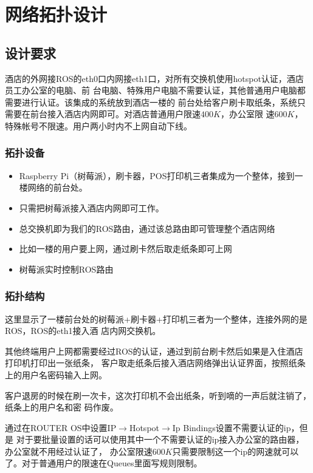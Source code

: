 \chapter{网络拓扑设计}

\section{设计要求}
酒店的外网接ROS的eth0口内网接eth1口，对所有交换机使用hotspot认证，酒店员工办公室的电脑、前
台电脑、特殊用户电脑不需要认证，其他普通用户电脑都需要进行认证。该集成的系统放到酒店一楼的
前台处给客户刷卡取纸条，系统只需要在前台接入酒店内网即可。对酒店普通用户限速$400K$，办公室限
速$600K$，特殊帐号不限速。用户两小时内不上网自动下线。

\subsection{拓扑设备}

\begin{itemize}
\item Raspberry Pi（树莓派），刷卡器，POS打印机三者集成为一个整体，接到一楼网络的前台处。
\item 只需把树莓派接入酒店内网即可工作。
\item 总交换机即为我们的ROS路由，通过该总路由即可管理整个酒店网络
\item 比如一楼的用户要上网，通过刷卡然后取走纸条即可上网
\item 树莓派实时控制ROS路由
\end{itemize}

\subsection{拓扑结构}

这里显示了一楼前台处的树莓派+刷卡器+打印机三者为一个整体，连接外网的是ROS，ROS的eth1接入酒
店内网交换机。

其他终端用户上网都需要经过ROS的认证，通过到前台刷卡然后如果是入住酒店打印机打印出一张纸条，
客户取走纸条后接入酒店网络弹出认证界面，按照纸条上的用户名密码输入上网。

客户退房的时候在刷一次卡，这次打印机不会出纸条，听到嘀的一声后就注销了，纸条上的用户名和密
码作废。

通过在ROUTER OS中设置IP$\rightarrow$Hotspot$\rightarrow$Ip Bindings设置不需要认证的ip，但是
对于要批量设置的话可以使用其中一个不需要认证的ip接入办公室的路由器，办公室就不用经过认证了，
办公室限速$600K$只需要限制这一个ip的网速就可以了。对于普通用户的限速在Queues里面写规则限制。

